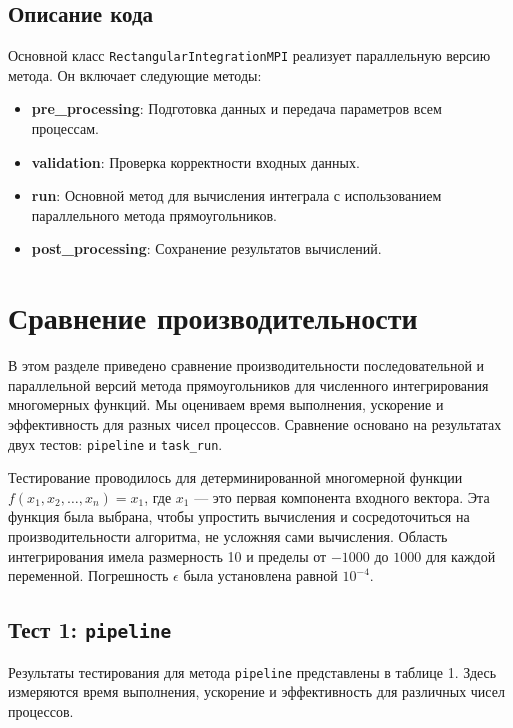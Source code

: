\documentclass[12pt]{article}
\begin{document}
\subsection*{Описание кода}

Основной класс \texttt{RectangularIntegrationMPI} реализует параллельную версию метода. Он включает следующие методы:

\begin{itemize}
\item \textbf{pre\_processing}: Подготовка данных и передача параметров всем процессам.
\item \textbf{validation}: Проверка корректности входных данных.
\item \textbf{run}: Основной метод для вычисления интеграла с использованием параллельного метода прямоугольников.
\item \textbf{post\_processing}: Сохранение результатов вычислений.
\end{itemize}

\newpage
\newpage
\section*{Сравнение производительности}
В этом разделе приведено сравнение производительности последовательной и параллельной версий метода прямоугольников для численного интегрирования многомерных функций. Мы оцениваем время выполнения, ускорение и эффективность для разных чисел процессов. Сравнение основано на результатах двух тестов: \texttt{pipeline} и \texttt{task\_run}.

\noindent Тестирование проводилось для детерминированной многомерной функции \( f(x_1, x_2, \dots, x_n) = x_1 \), где \( x_1 \) — это первая компонента входного вектора. Эта функция была выбрана, чтобы упростить вычисления и сосредоточиться на производительности алгоритма, не усложняя сами вычисления. Область интегрирования имела размерность 10 и пределы от \(-1000\) до \(1000\) для каждой переменной. Погрешность \(\epsilon\) была установлена равной \(10^{-4}\).

\subsection*{Тест 1: \texttt{pipeline}}

Результаты тестирования для метода \texttt{pipeline} представлены в таблице 1. Здесь измеряются время выполнения, ускорение и эффективность для различных чисел процессов.
\end{document}
